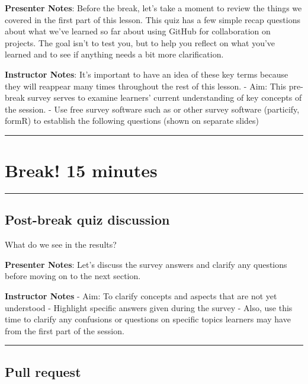 \documentclass[
  letterpaper,
  DIV=11,
  numbers=noendperiod]{scrartcl}
\begin{document}
\textbf{Presenter Notes}: Before the break, let's take a moment to
review the things we covered in the first part of this lesson. This quiz
has a few simple recap questions about what we've learned so far about
using GitHub for collaboration on projects. The goal isn't to test you,
but to help you reflect on what you've learned and to see if anything
needs a bit more clarification.

\textbf{Instructor Notes}: It's important to have an idea of these key
terms because they will reappear many times throughout the rest of this
lesson. - Aim: This pre-break survey serves to examine learners' current
understanding of key concepts of the session. - Use free survey software
such as or other survey software (particify, formR) to establish the
following questions (shown on separate slides)

\begin{center}\rule{0.5\linewidth}{0.5pt}\end{center}

\section{Break! 15 minutes}\label{break-15-minutes}

\begin{center}\rule{0.5\linewidth}{0.5pt}\end{center}

\subsection{Post-break quiz
discussion}\label{post-break-quiz-discussion}

What do we see in the results?

\textbf{Presenter Notes}: Let's discuss the survey answers and clarify
any questions before moving on to the next section.

\textbf{Instructor Notes} - Aim: To clarify concepts and aspects that
are not yet understood - Highlight specific answers given during the
survey - Also, use this time to clarify any confusions or questions on
specific topics learners may have from the first part of the session.

\begin{center}\rule{0.5\linewidth}{0.5pt}\end{center}

\subsection{Pull request}\label{pull-request}
\end{document}
